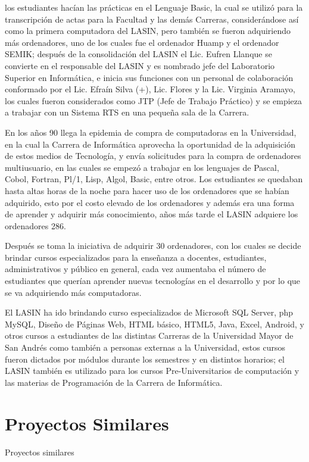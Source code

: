 los estudiantes hacían las prácticas en el Lenguaje Basic, la cual se utilizó
para la transcripción de actas para la Facultad y las demás Carreras, considerándose
así como la primera computadora del LASIN, pero también se fueron adquiriendo más
ordenadores, uno de los cuales fue el ordenador Huamp y el ordenador SEMIK; después
de la consolidación del LASIN el Lic. Eufren Llanque se convierte en el responsable
del LASIN y es nombrado jefe del Laboratorio Superior en Informática, e inicia sus
funciones con un personal de colaboración conformado por el Lic. Efraín Silva (+),
Lic. Flores y la Lic. Virginia Aramayo, los cuales fueron considerados como JTP
(Jefe de Trabajo Práctico) y se empieza a trabajar con un Sistema RTS en una
pequeña sala de la Carrera.

En los años 90 llega la epidemia de compra de computadoras en la Universidad, en
la cual la Carrera de Informática aprovecha la oportunidad de la adquisición de
estos medios de Tecnología, y envía solicitudes para la compra de ordenadores
multiusuario, en las cuales se empezó a trabajar en los lenguajes de Pascal, Cobol,
Fortran, Pl/1, Lisp, Algol, Basic, entre otros. Los estudiantes se quedaban hasta
altas horas de la noche para hacer uso de los ordenadores que se habían adquirido,
esto por el costo elevado de los ordenadores y además era una forma de aprender y
adquirir más conocimiento, años más tarde el LASIN adquiere los ordenadores 286.

Después se toma la iniciativa de adquirir 30 ordenadores, con los cuales se decide
brindar cursos especializados para la enseñanza a docentes, estudiantes,
administrativos y público en general, cada vez aumentaba el número de estudiantes
que querían aprender nuevas tecnologías en el desarrollo y por lo que se va
adquiriendo más computadoras.

El LASIN ha ido brindando curso especializados de Microsoft SQL Server, php MySQL,
Diseño de Páginas Web, HTML básico, HTML5, Java, Excel, Android, y otros cursos a
estudiantes de las distintas Carreras de la Universidad Mayor de San Andrés como
también a personas externas a la Universidad, estos cursos fueron dictados por
módulos durante los semestres y en distintos horarios; el LASIN también es utilizado
para los cursos Pre-Universitarios de computación y las materias de Programación
de la Carrera de Informática.
\section{Proyectos Similares}
Proyectos similares
